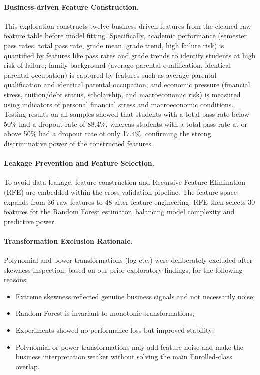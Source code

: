 \documentclass[11pt]{article}
\begin{document}
\paragraph{Business-driven Feature Construction.}
This exploration constructs twelve business-driven features from the cleaned raw feature table before model fitting. Specifically, academic performance (semester pass rates, total pass rate, grade mean, grade trend, high failure risk) is quantified by features like pass rates and grade trends to identify students at high risk of failure; family background (average parental qualification, identical parental occupation) is captured by features such as average parental qualification and identical parental occupation; and economic pressure (financial stress, tuition/debt status, scholarship, and macroeconomic risk) is measured using indicators of personal financial stress and macroeconomic conditions. Testing results on all samples showed that students with a total pass rate below 50\% had a dropout rate of 88.4\%, whereas students with a total pass rate at or above 50\% had a dropout rate of only 17.4\%, confirming the strong discriminative power of the constructed features.

\paragraph{Leakage Prevention and Feature Selection.}
To avoid data leakage, feature construction and Recursive Feature Elimination (RFE) are embedded within the cross-validation pipeline. The feature space expands from 36 raw features to 48 after feature engineering; RFE then selects 30 features for the Random Forest estimator, balancing model complexity and predictive power.

\paragraph{Transformation Exclusion Rationale.}
Polynomial and power transformations (log etc.) were deliberately excluded after skewness inspection, based on our prior exploratory findings, for the following reasons:
\begin{itemize}
  \item Extreme skewness reflected genuine business signals and not necessarily noise;
  \item Random Forest is invariant to monotonic transformations;
  \item Experiments showed no performance loss but improved stability;
  \item Polynomial or power transformations may add feature noise and make the business interpretation weaker without solving the main Enrolled-class overlap.
\end{itemize}
\end{document}
